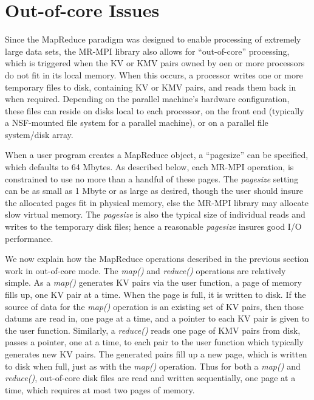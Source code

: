 \section{Out-of-core Issues}
\label{sec:outcore}

Since the MapReduce paradigm was designed to enable processing of
extremely large data sets, the MR-MPI library also allows for
``out-of-core'' processing, which is triggered when the KV or KMV
pairs owned by oen or more processors do not fit in its local memory.
When this occurs, a processor writes one or more temporary files to
disk, containing KV or KMV pairs, and reads them back in when
required.  Depending on the parallel machine's hardware configuration,
these files can reside on disks local to each processor, on the front
end (typically a NSF-mounted file system for a parallel machine), or
on a parallel file system/disk array.

When a user program creates a MapReduce object, a ``pagesize'' can be
specified, which defaults to 64 Mbytes.  As described below, each
MR-MPI operation, is constrained to use no more than a handful of
these pages.  The {\it pagesize} setting can be as small as 1 Mbyte or
as large as desired, though the user should insure the allocated pages
fit in physical memory, else the MR-MPI library may allocate slow
virtual memory.  The {\it pagesize} is also the typical size of
individual reads and writes to the temporary disk files; hence a
reasonable {\it pagesize} insures good I/O performance.

We now explain how the MapReduce operations described in the previous
section work in out-of-core mode.  The {\it map()} and {\it reduce()}
operations are relatively simple.  As a {\it map()} generates KV pairs
via the user function, a page of memory fills up, one KV pair at a
time.  When the page is full, it is written to disk.  If the source of
data for the {\it map()} operation is an existing set of KV pairs,
then those datums are read in, one page at a time, and a pointer to
each KV pair is given to the user function.  Similarly, a {\it
reduce()} reads one page of KMV pairs from disk, passes a pointer, one
at a time, to each pair to the user function which typically generates
new KV pairs.  The generated pairs fill up a new page, which is
written to disk when full, just as with the {\it map()} operation.
Thus for both a {\it map()} and {\it reduce()}, out-of-core disk files
are read and written sequentially, one page at a time, which requires
at most two pages of memory.

